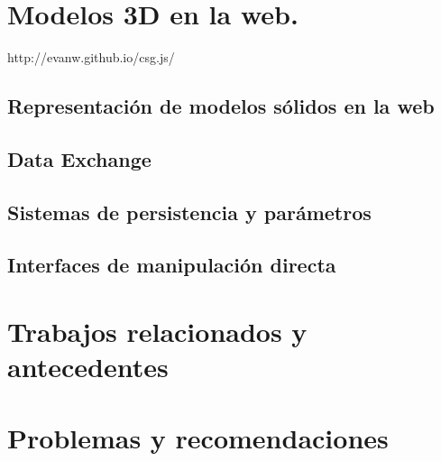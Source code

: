\section{Modelos 3D en la web. 
}

http://evanw.github.io/csg.js/

\subsection{Representación de modelos sólidos en la web
}

\subsection{Data Exchange
}

\subsection{Sistemas de persistencia y parámetros
}

\subsection{Interfaces de manipulación directa}

\section{Trabajos relacionados y antecedentes}

\section{Problemas y recomendaciones
}